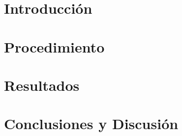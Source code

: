 \documentclass[a4paper, 11pt, spanish]{article}
\begin{document}

\newpage

\tableofcontents %

\newpage

\section{Introducci\'on}

\section{Procedimiento}

\section{Resultados}

\section{Conclusiones y Discusi\'on}
\end{document}
